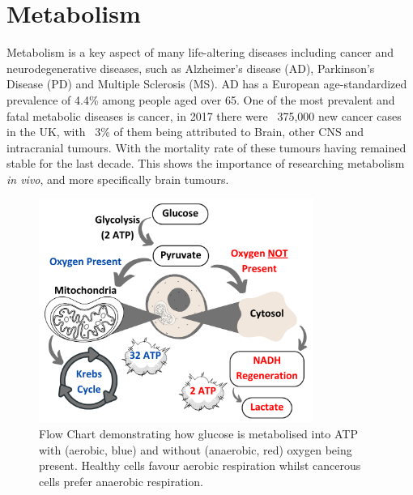 \documentclass[class=article, crop=false]{standalone}
\begin{document}
\section{Metabolism}

Metabolism is a key aspect of many life-altering diseases including cancer and neurodegenerative diseases, such as Alzheimer's disease (AD), Parkinson's Disease (PD) and Multiple Sclerosis (MS)\cite{Gialleonardo2016TheImaging}. AD has a European age-standardized prevalence of 4.4\% among people aged over 65\cite{Qiu2009EpidemiologyIntervention}. One of the most prevalent and fatal metabolic diseases is cancer, in 2017 there were ~375,000 new cancer cases in the UK\cite{CancerUK}, with ~3\% of them being attributed to Brain, other CNS and intracranial tumours\cite{BrainUK}. With the mortality rate of these tumours having remained stable for the last decade\cite{BrainUK}. This shows the importance of researching metabolism \textit{in vivo}, and more specifically brain tumours.

\begin{figure}
    \centering
    \includegraphics[width=0.8\textwidth]{Figures/Intro/Metabolism.png}
    \caption{Flow Chart demonstrating how glucose is metabolised into ATP with (aerobic, blue) and without (anaerobic, red) oxygen being present. Healthy cells favour aerobic respiration whilst cancerous cells prefer anaerobic respiration.}
    \label{fig:intro:Metabolism}
\end{figure}
\end{document}
